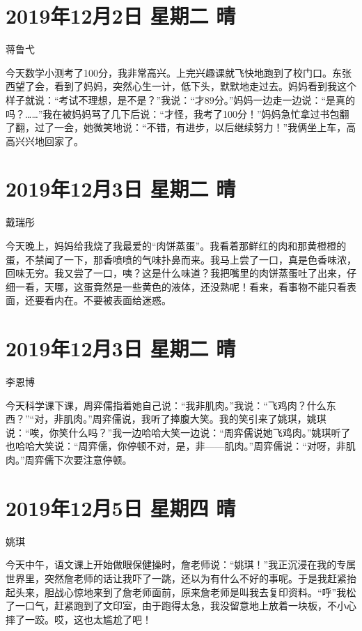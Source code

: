 \section{2019年12月2日 星期二 晴}

蒋鲁弋

今天数学小测考了100分，我非常高兴。上完兴趣课就飞快地跑到了校门口。东张西望了会，看到了妈妈，突然心生一计，低下头，默默地走过去。妈妈看到我这个样子就说：``考试不理想，是不是？''我说：``才89分。''妈妈一边走一边说：``是真的吗？\ldots\ldots{}''我在被妈妈骂了几下后说：``才怪，我考了100分！''妈妈急忙拿过书包翻了翻，过了一会，她微笑地说：``不错，有进步，以后继续努力！''我俩坐上车，高高兴兴地回家了。

\section{2019年12月3日 星期二 晴}

戴瑞彤

今天晚上，妈妈给我烧了我最爱的``肉饼蒸蛋''。我看着那鲜红的肉和那黄橙橙的蛋，不禁闻了一下，那香喷喷的气味扑鼻而来。我马上尝了一口，真是色香味浓，回味无穷。我又尝了一口，咦？这是什么味道？我把嘴里的肉饼蒸蛋吐了出来，仔细一看，天哪，这蛋竟然是一些黄色的液体，还没熟呢！看来，看事物不能只看表面，还要看内在。不要被表面给迷惑。

\section{2019年12月3日 星期二 晴}

李恩博

今天科学课下课，周弈儒指着她自己说：``我非肌肉。''我说：``飞鸡肉？什么东西？''``对，非肌肉。''周弈儒说，我听了捧腹大笑。我的笑引来了姚琪，姚琪说：``唉，你笑什么吗？''我一边哈哈大笑一边说：``周弈儒说她飞鸡肉。''姚琪听了也哈哈大笑说：``周弈儒，你停顿不对，是，非------肌肉。''周弈儒说：``对呀，非肌肉。''周弈儒下次要注意停顿。

\section{2019年12月5日 星期四 晴}

姚琪

今天中午，语文课上开始做眼保健操时，詹老师说：``姚琪！''我正沉浸在我的专属世界里，突然詹老师的话让我吓了一跳，还以为有什么不好的事呢。于是我赶紧抬起头来，胆战心惊地来到了詹老师面前，原来詹老师是叫我去复印资料。``呼''我松了一口气，赶紧跑到了文印室，由于跑得太急，我没留意地上放着一块板，不小心摔了一跤。哎，这也太尴尬了吧！

